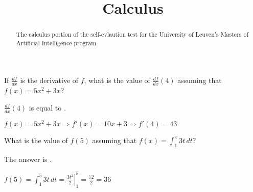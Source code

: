 \documentclass{ximera}
\title{Calculus}
\begin{document}
\begin{abstract}
The calculus portion of the self-evlaution test for the University of
Leuven's Masters of Artificial Intelligence program.
\end{abstract}
\maketitle

\begin{question}
If $\frac{df}{dx}$ is the derivative of $f$, what is the value of
$\frac{df}{dx}(4)$ assuming that $f(x) = 5x^2 +3x$?

\begin{solution}
$\frac{df}{dx}(4)$ is equal to .
\end{solution}
$f(x) = 5x^2 + 3x \Rightarrow f'(x) = 10 x + 3 \Rightarrow f'(4) = 43$
\end{question}

\begin{question}
What is the value of $f(5) $ assuming that $f(x) = \int_1^x 3t \,dt$?
\begin{solution}
The answer is .
\end{solution}
$f(5) = \int_1^5 3t \,dt = \left. \frac{3t^2}{2} \right|_1^5 =
\frac{72}{2} = 36$
\end{question}
\end{document}
